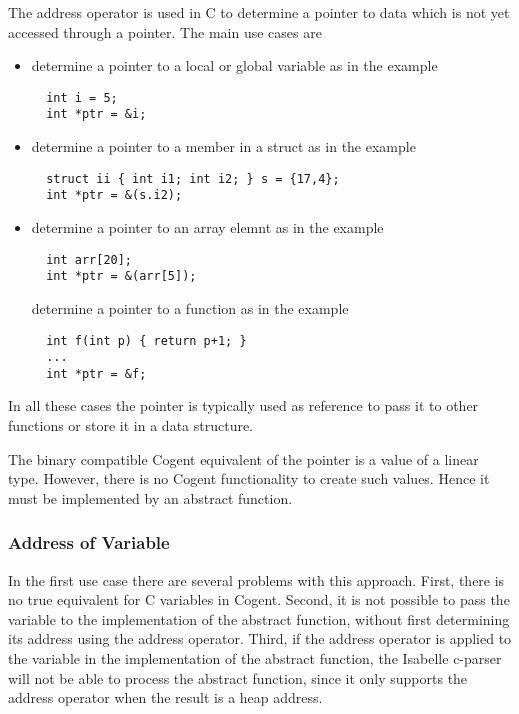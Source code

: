 The address operator \code{\&} is used in C to determine a pointer to data which is not yet accessed through a 
pointer. The main use cases are
\begin{itemize}
\item determine a pointer to a local or global variable as in the example
\begin{verbatim}
  int i = 5;
  int *ptr = &i;
\end{verbatim}

\item determine a pointer to a member in a struct as in the example
\begin{verbatim}
  struct ii { int i1; int i2; } s = {17,4};
  int *ptr = &(s.i2);
\end{verbatim}

\item determine a pointer to an array elemnt as in the example
\begin{verbatim}
  int arr[20];
  int *ptr = &(arr[5]);
\end{verbatim}

determine a pointer to a function as in the example
\begin{verbatim}
  int f(int p) { return p+1; }
  ...
  int *ptr = &f;
\end{verbatim}
\end{itemize}

In all these cases the pointer is typically used as reference to pass it to other functions or store it
in a data structure.

The binary compatible Cogent equivalent of the pointer is a value of a linear type. However, there is
no Cogent functionality to create such values. Hence it must be implemented by an abstract function.

\subsubsection{Address of Variable}

In the first use case there are several problems with this approach. First, there is no true equivalent
for C variables in Cogent. Second, it is not possible to pass the variable to the implementation of the
abstract function, without first determining its address using the address operator. Third, if the address
operator is applied to the variable in the implementation of the abstract function, the Isabelle c-parser
will not be able to process the abstract function, since it only supports the address operator when 
the result is a heap address.

